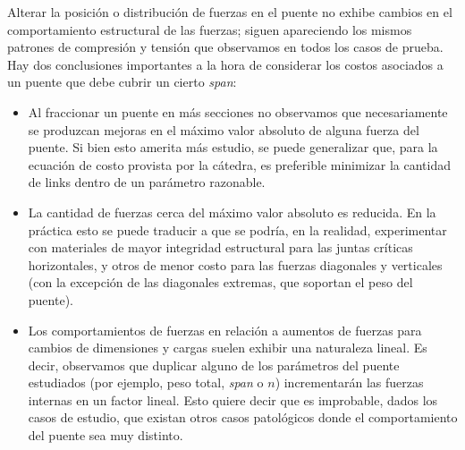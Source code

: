 Alterar la posición o distribución de fuerzas en el puente no exhibe cambios en el comportamiento estructural de las fuerzas; siguen apareciendo los mismos patrones de compresión y tensión que observamos en todos los casos de prueba.\\

Hay dos conclusiones importantes a la hora de considerar los costos asociados a un puente que debe cubrir un cierto \textit{span}:

\begin{itemize}
\item Al fraccionar un puente en más secciones no observamos que necesariamente se produzcan mejoras en el máximo valor absoluto de alguna fuerza del puente. Si bien esto amerita más estudio, se puede generalizar que, para la ecuación de costo provista por la cátedra, es preferible minimizar la cantidad de links dentro de un parámetro razonable.
\item La cantidad de fuerzas cerca del máximo valor absoluto es reducida. En la práctica esto se puede traducir a que se podría, en la realidad, experimentar con materiales de mayor integridad estructural para las juntas críticas horizontales, y otros de menor costo para las fuerzas diagonales y verticales (con la excepción de las diagonales extremas, que soportan el peso del puente).
\item Los comportamientos de fuerzas en relación a aumentos de fuerzas para cambios de dimensiones y cargas suelen exhibir una naturaleza lineal. Es decir, observamos que duplicar alguno de los parámetros del puente estudiados (por ejemplo, peso total, \textit{span} o $n$) incrementarán las fuerzas internas en un factor lineal. Esto quiere decir que es improbable, dados los casos de estudio, que existan otros casos patológicos donde el comportamiento del puente sea muy distinto.
\end{itemize}
